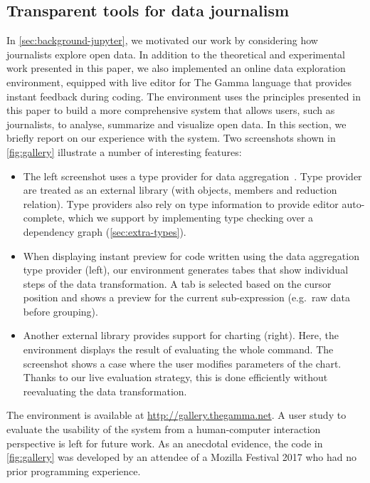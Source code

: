\documentclass[english,crc,references=cleveref]{programming}
\theoremstyle{plain}
\theoremstyle{definition}
\begin{document}

\subsection{Transparent tools for data journalism}
\label{sec:evaluation-case}

In \cref{sec:background-jupyter}, we motivated our work by considering how journalists
explore open data. In addition to the theoretical and experimental work presented in this paper,
we also implemented an online data exploration environment, equipped with live editor for The
Gamma language that provides instant feedback during coding. The environment uses the
principles presented in this paper to build a more comprehensive system that allows users,
such as journalists, to analyse, summarize and visualize open data. In this section, we briefly
report on our experience with the system. Two screenshots shown
in \cref{fig:gallery} illustrate a number of interesting features:

\begin{itemize}
\item The left screenshot uses a type provider for data aggregation~\cite{gamma}.
  Type provider are treated as an external library
  (with objects, members and reduction relation). Type providers also rely on type information to
  provide editor auto-complete, which we support by implementing type checking over a
  dependency graph (\cref{sec:extra-types}).

\item When displaying instant preview for code written using the data aggregation type provider (left),
  our environment generates tabes that show individual steps of the data transformation.
  A tab is selected based on the cursor position and shows a preview for the current sub-expression
  (e.\hairspace g.~raw data before grouping).

\item Another external library provides support for charting (right). Here, the environment
  displays the result of evaluating the whole command. The screenshot shows a case where the user
  modifies parameters of the chart. Thanks to our live evaluation
  strategy, this is done efficiently without reevaluating the data transformation.
\end{itemize}
%
%
The environment is available at \url{http://gallery.thegamma.net}.
A user study to evaluate the usability of the system from a human-computer interaction perspective
is left for future work. As an anecdotal evidence, the code in
\cref{fig:gallery} was developed by an attendee of a Mozilla Festival 2017
who had no prior programming experience.
\end{document}
